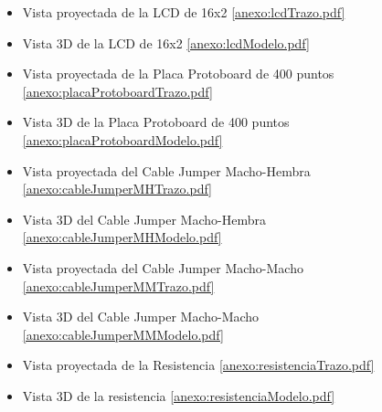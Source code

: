         \begin{itemize}
            \item Vista proyectada de la LCD de 16x2
            \ref{anexo:lcdTrazo.pdf}
        \end{itemize}
        \begin{itemize}
            \item Vista 3D de la LCD de 16x2
            \ref{anexo:lcdModelo.pdf}
        \end{itemize}

        \begin{itemize}
            \item Vista proyectada de la Placa Protoboard de 400 puntos
            \ref{anexo:placaProtoboardTrazo.pdf}
        \end{itemize}
        \begin{itemize}
            \item Vista 3D de la Placa Protoboard de 400 puntos
            \ref{anexo:placaProtoboardModelo.pdf}
        \end{itemize}
       
        \begin{itemize}
            \item Vista proyectada del Cable Jumper Macho-Hembra
            \ref{anexo:cableJumperMHTrazo.pdf}
        \end{itemize}
        \begin{itemize}
            \item Vista 3D del Cable Jumper Macho-Hembra
            \ref{anexo:cableJumperMHModelo.pdf}
        \end{itemize}

        \begin{itemize}
            \item Vista proyectada del Cable Jumper Macho-Macho
            \ref{anexo:cableJumperMMTrazo.pdf}
        \end{itemize}
        \begin{itemize}
            \item Vista 3D del Cable Jumper Macho-Macho
            \ref{anexo:cableJumperMMModelo.pdf}
        \end{itemize}

        \begin{itemize}
            \item Vista proyectada de la Resistencia
            \ref{anexo:resistenciaTrazo.pdf}
        \end{itemize}
        \begin{itemize}
            \item Vista 3D de la resistencia
            \ref{anexo:resistenciaModelo.pdf}
        \end{itemize}
        
